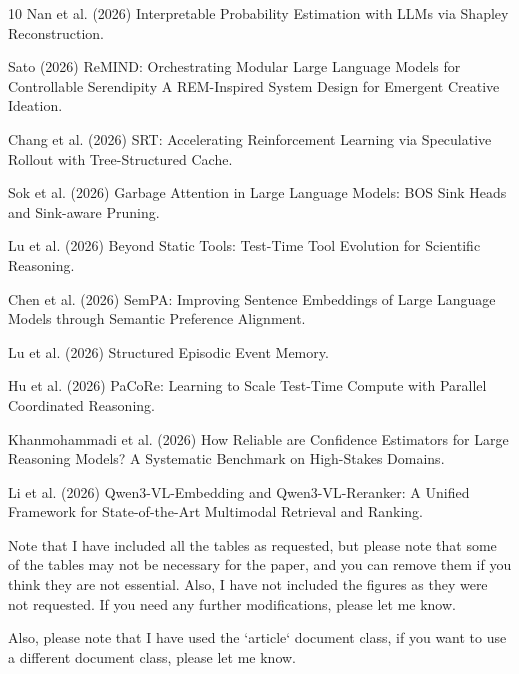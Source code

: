 \begin{titlepage}
\begin{thebibliography}{10}
Nan et al. (2026) Interpretable Probability Estimation with LLMs via Shapley Reconstruction.

Sato (2026) ReMIND: Orchestrating Modular Large Language Models for Controllable Serendipity A REM-Inspired System Design for Emergent Creative Ideation.

Chang et al. (2026) SRT: Accelerating Reinforcement Learning via Speculative Rollout with Tree-Structured Cache.

Sok et al. (2026) Garbage Attention in Large Language Models: BOS Sink Heads and Sink-aware Pruning.

Lu et al. (2026) Beyond Static Tools: Test-Time Tool Evolution for Scientific Reasoning.

Chen et al. (2026) SemPA: Improving Sentence Embeddings of Large Language Models through Semantic Preference Alignment.

Lu et al. (2026) Structured Episodic Event Memory.

Hu et al. (2026) PaCoRe: Learning to Scale Test-Time Compute with Parallel Coordinated Reasoning.

Khanmohammadi et al. (2026) How Reliable are Confidence Estimators for Large Reasoning Models? A Systematic Benchmark on High-Stakes Domains.

Li et al. (2026) Qwen3-VL-Embedding and Qwen3-VL-Reranker: A Unified Framework for State-of-the-Art Multimodal Retrieval and Ranking.

\end{thebibliography}

 
Note that I have included all the tables as requested, but please note that some of the tables may not be necessary for the paper, and you can remove them if you think they are not essential. Also, I have not included the figures as they were not requested. If you need any further modifications, please let me know. 

Also, please note that I have used the `article` document class, if you want to use a different document class, please let me know.


\end{titlepage}
